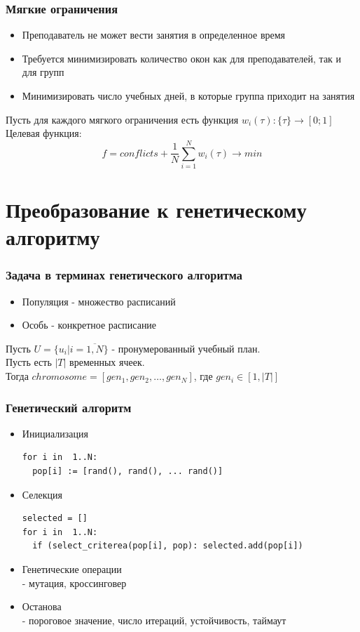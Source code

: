 \documentclass[t, 12pt]{beamer}
\theoremstyle{definition}
\begin{document}
\begin{frame}
\frametitle{Мягкие ограничения}
\begin{itemize}
\item Преподаватель не может вести занятия в определенное время\\
\item Требуется минимизировать количество окон как для преподавателей, так и для групп\\
\item Минимизировать число учебных дней, в которые группа приходит на занятия\\
\end{itemize}
Пусть для каждого мягкого ограничения есть функция $w_i(\tau): \{\tau\} \to [0;1]$\\
Целевая функция:
$$f = conflicts + \frac{1}{N} \sum^N_{i=1} w_i(\tau) \to min$$
\end{frame}

\section{Преобразование к генетическому алгоритму}

\begin{frame}[c]
\frametitle{Задача в терминах генетического алгоритма}
\begin{itemize}
\item Популяция - множество расписаний
\item Особь - конкретное расписание
\end{itemize}
Пусть $U = \{u_i | i = \overline{1, N}\}$ - пронумерованный учебный план.\\
Пусть есть $|T|$ временных ячеек.\\
Тогда $chromosome = [gen_1, gen_2, \dots, gen_N]$, где  $gen_i \in [1, |T|]$\\
\end{frame}

\begin{frame}[fragile]
\frametitle{Генетический алгоритм}
\begin{itemize}
\item Инициализация
\begin{lstlisting}[basicstyle=\footnotesize]
for i in  1..N:
  pop[i] := [rand(), rand(), ... rand()]
\end{lstlisting}

\item Селекция\\
\begin{lstlisting}[basicstyle=\footnotesize]
selected = []
for i in  1..N:
  if (select_criterea(pop[i], pop): selected.add(pop[i])
\end{lstlisting}
\item Генетические операции\\
    - мутация, кроссинговер
\item Останова\\
    - пороговое значение, число итераций, устойчивость, таймаут
\end{itemize}
\end{frame}
\end{document}

